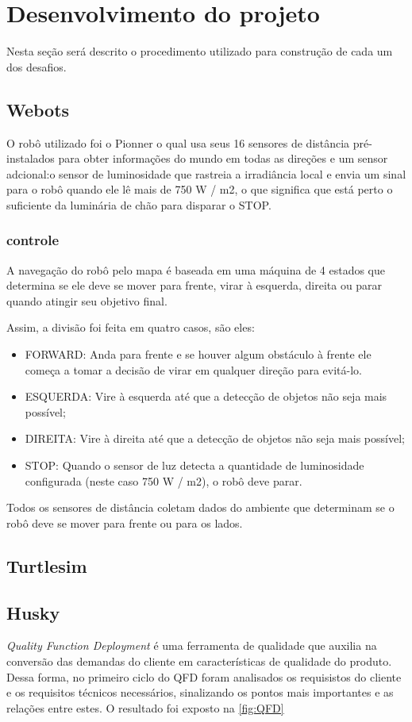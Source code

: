 \chapter{Desenvolvimento do projeto}
\label{chap:metod}
Nesta seção será descrito o procedimento utilizado para construção de cada um dos desafios.

\section{Webots}
O robô utilizado foi o Pionner o qual usa seus 16 sensores de distância pré-instalados para obter informações do mundo em todas as direções 
e um sensor adcional:o sensor de luminosidade que rastreia a irradiância local e envia um sinal para o robô quando ele lê mais de 750 W / m2, 
o que significa que está perto o suficiente da luminária de chão para disparar o STOP.

\subsection{controle}
A navegação do robô pelo mapa é baseada em uma máquina de 4 estados que determina se ele deve se mover para frente,
virar à esquerda, direita ou parar quando atingir seu objetivo final.

Assim, a divisão foi feita em quatro casos, são eles:
\begin{itemize}
    \item FORWARD: Anda para frente e se houver algum obstáculo à frente ele começa a tomar a decisão de virar em qualquer direção para evitá-lo.
    \item ESQUERDA: Vire à esquerda até que a detecção de objetos não seja mais possível;
    \item DIREITA: Vire à direita até que a detecção de objetos não seja mais possível;
    \item STOP: Quando o sensor de luz detecta a quantidade de luminosidade configurada (neste caso 750 W / m2), o robô deve parar.
\end{itemize}
Todos os sensores de distância coletam dados do ambiente que determinam se o robô deve se mover para frente ou para os lados.
\section{Turtlesim}

\section{Husky}
\textit{Quality Function Deployment} é uma ferramenta de qualidade que auxilia na conversão das demandas do cliente em características de qualidade do produto. Dessa forma, no primeiro ciclo do QFD foram analisados os requisistos do cliente e os requisitos técnicos necessários, sinalizando os pontos mais importantes e as relações entre estes. O resultado foi exposto na \ref{fig:QFD}

